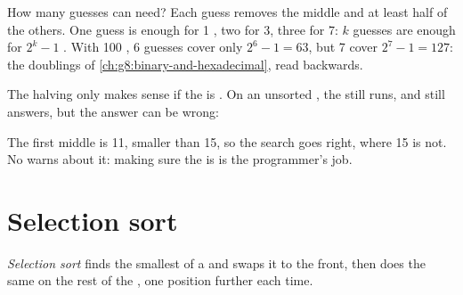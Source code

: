 How many guesses can  need? Each guess removes the middle 
and at least half of the others. One guess is enough for 1 , two for 3,
three for 7: $k$ guesses are enough for $2^k - 1$ . With 100 , 6
guesses cover only $2^6 - 1 = 63$, but 7 cover $2^7 - 1 = 127$: the doublings
of \cref{ch:g8:binary-and-hexadecimal}, read backwards.

The halving only makes sense if the  is . On an unsorted , the
 still runs, and still answers, but the answer can be wrong:

\label{lst:g8:searching-and-sorting:unsorted}

\label{out:g8:searching-and-sorting:unsorted}

The first middle  is 11, smaller than 15, so the search goes right, where
15 is not. No  warns about it: making sure the  is  is
the programmer's job.

\section{Selection sort}

\begin{definition}\label{def:g8:searching-and-sorting:selection-sort}
\emph{Selection sort} finds the smallest  of a 
and swaps it to the front, then does the same on the rest of the , one
position further each time.
\end{definition}

